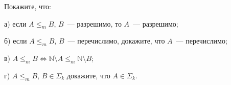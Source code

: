 Покажите, что:
\begin{enumcyr}
    \item [а)] если $A {\le}_{m} B$, $B$~--- разрешимо, то $A$~--- разрешимо;
    \item [б)] если $A {\le}_{m} B$, $B$~--- перечислимо, докажите, что $A$~--- перечислимо;
    \item [в)] $A {\le}_{m} B \Leftrightarrow \mathbb{N} \setminus A \le_m \mathbb{N} \setminus B$;
    \item [г)] $A {\le}_{m} B$, $B \in \Sigma_k$ докажите, что $A \in \Sigma_k$.
\end{enumcyr}